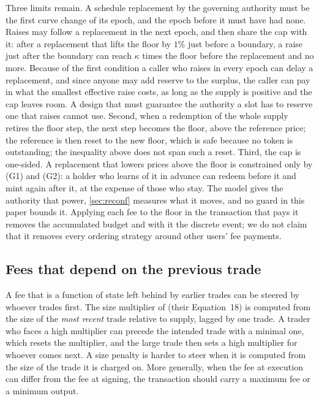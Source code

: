 Three limits remain. A schedule replacement by the governing authority must be the first curve change of its epoch, and the epoch before it must have had none. Raises may follow a replacement in the next epoch, and then share the cap with it: after a replacement that lifts the floor by $1\%$ just before a boundary, a raise just after the boundary can reach $\kappa$ times the floor before the replacement and no more. Because of the first condition  a caller who raises in every epoch can delay a replacement, and since anyone may add reserve to the surplus, the caller can pay in what the smallest effective raise costs, as long as the supply is positive and the cap leaves room. A design that must guarantee the authority a slot has to reserve one that raises cannot use. Second, when a redemption of the whole supply retires the floor step, the next step becomes the floor, above the reference price; the reference is then reset to the new floor, which is safe because no token is outstanding; the inequality above does not span such a reset. Third, the cap is one-sided. A replacement that lowers prices above the floor is constrained only by (G1) and (G2): a holder who learns of it in advance can redeem before it and mint again after it, at the expense of those who stay. The model gives the authority that power, \cref{sec:reconf} measures what it moves, and no guard in this paper bounds it. Applying each fee to the floor in the transaction that pays it removes the accumulated budget and with it the discrete event; we do not claim that it removes every ordering strategy around other users' fee payments.

\subsection{Fees that depend on the previous trade}

A fee that is a function of state left behind by earlier trades can be steered by whoever trades first. The size multiplier of \vone{} (their Equation~18) is computed from the size of the \emph{most recent} trade relative to supply, lagged by one trade. A trader who faces a high multiplier can precede the intended trade with a minimal one, which resets the multiplier, and the large trade then sets a high multiplier for whoever comes next. A size penalty is harder to steer when it is computed from the size of the trade it is charged on. More generally, when the fee at execution can differ from the fee at signing, the transaction should carry a maximum fee or a minimum output.

